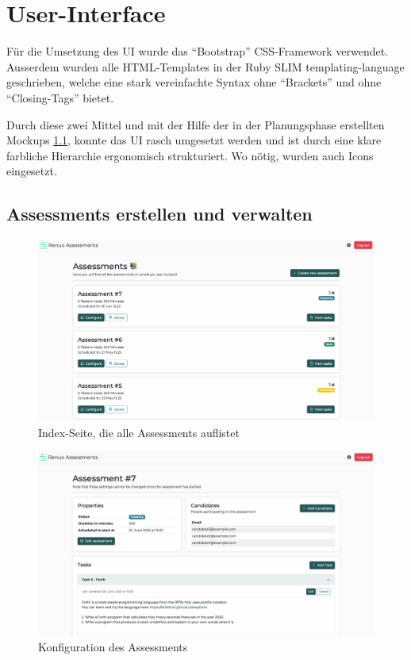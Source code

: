 \section{User-Interface}

Für die Umsetzung des UI wurde das \enquote{Bootstrap} CSS-Framework verwendet. Ausserdem wurden alle
HTML-Templates in der Ruby SLIM templating-language geschrieben, 
welche eine stark vereinfachte Syntax ohne \enquote{Brackets} und ohne \enquote{Closing-Tags} bietet.

Durch diese zwei Mittel und mit der Hilfe der in der Planungsphase erstellten Mockups \ref{}, konnte das UI
rasch umgesetzt werden und ist durch eine klare farbliche Hierarchie ergonomisch strukturiert. Wo nötig, wurden auch
Icons eingesetzt. 

\subsection{Assessments erstellen und verwalten}

\begin{figure}[H]
  \centering
  \includegraphics[width=\textwidth]{images/ui/assessments-index.png}
  \caption{\label{fig:assessments-index}Index-Seite, die alle Assessments auflistet}
\end{figure}

\begin{figure}[H]
  \centering
  \includegraphics[width=\textwidth]{images/ui/assessments-edit.png}
  \caption{\label{fig:assessments-edit}Konfiguration des Assessments}
\end{figure}

